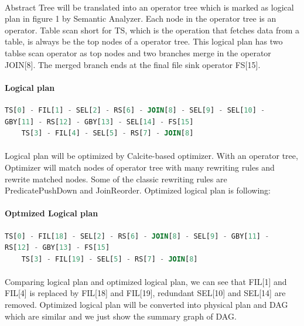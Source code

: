         \paragraph{}
        Abstract Tree will be translated into an operator tree which is marked as logical plan in figure 1 by 
        Semantic Analyzer. Each node in the operator tree is an operator. Table scan short for TS,  which is 
        the operation that fetches data from a table, is always be the top nodes of a operator tree. This 
        logical plan has two tablse scan operator as top nodes and two branches merge in the operator JOIN[8]. 
        The merged branch ends at  the final file sink operator FS[15].
        \paragraph*{Logical plan}
        \begin{lstlisting}[language={SQL},%frame=shadowbox,    
            keywordstyle=\color{blue!30!black},  
            basicstyle=\ttfamily]  
    TS[0] - FIL[1] - SEL[2] - RS[6] - JOIN[8] - SEL[9] - SEL[10] - 
GBY[11] - RS[12] - GBY[13] - SEL[14] - FS[15]
    TS[3] - FIL[4] - SEL[5] - RS[7] - JOIN[8]
        \end{lstlisting}
        \paragraph{}
        Logical plan will be optimized by Calcite-based optimizer. With an operator tree, Optimizer will 
        match nodes of operator tree with many rewriting rules and rewrite matched nodes. Some of the classic
        rewriting rules are PredicatePushDown and JoinReorder. Optimized logical plan is following:
        \paragraph*{Optmized Logical plan}
        \begin{lstlisting}[language={SQL},%frame=shadowbox,    
            keywordstyle=\color{blue!30!black},  
            basicstyle=\ttfamily]  
    TS[0] - FIL[18] - SEL[2] - RS[6] - JOIN[8] - SEL[9] - GBY[11] - 
RS[12] - GBY[13] - FS[15]
    TS[3] - FIL[19] - SEL[5] - RS[7] - JOIN[8]
        \end{lstlisting} 
        \paragraph{}
        Comparing logical plan and optimized logical plan, we can see that FIL[1] and FIL[4] is replaced by 
        FIL[18] and FIL[19], redundant SEL[10] and SEL[14] are removed. Optimized logical plan will be converted
        into physical plan and DAG which are similar and we just show the summary graph of DAG.
